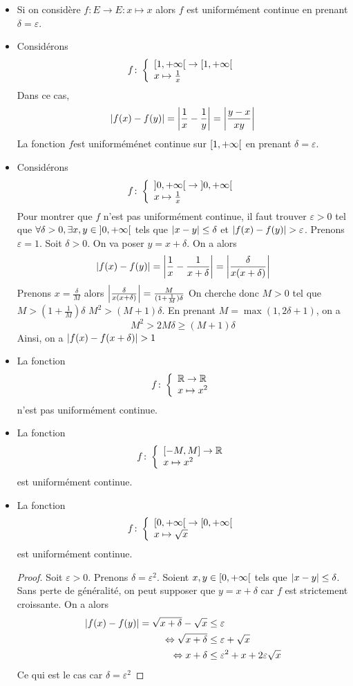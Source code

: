\begin{exemple}
    \begin{itemize}
        \item Si on considère $f : E\to E : x\mapsto x$ alors $f$ est uniformément continue en prenant $\delta = \varepsilon$.
        \item Considérons $$f\colon \left\{\begin{array}{l}\left[ 1,+\infty\right[\to \left[ 1,+\infty\right[ \\x\mapsto \frac1x\end{array}\right.$$
        Dans ce cas,$$\left| f(x)-f(y) \right| = \left| \frac1x - \frac1y \right| = \left| \frac{y-x}{xy} \right|$$
        La fonction $f$est uniforméménet continue sur $\left[ 1,+\infty\right[$ en prenant $\delta = \varepsilon$.
        \item Considérons $$f\colon \left\{\begin{array}{l}\left] 0,+\infty\right[\to\left] 0,+\infty\right[ \\x\mapsto\frac{1}{x}\end{array}\right.$$
        Pour montrer que $f$ n'est pas uniformément continue, il faut trouver $\varepsilon>0$ tel que $\forall\delta >0, \exists x,y\in \left] 0,+\infty\right[$ tels que $\left| x-y \right|\le \delta$ et $\abs{f(x)-f(y)}>\varepsilon$.
        Prenons $\varepsilon = 1$. Soit $\delta >0$. On va poser $y = x+\delta$. On a alors 
        \begin{align*}
            \left| f(x)-f(y) \right| = \left| \frac{1}{x}-\frac{1}{x+\delta} \right| = \left| \frac{\delta}{x(x+\delta)} \right|
        \end{align*}
        Prenons $x = \frac{\delta}{M}$ alors $\left| \frac{\delta}{x(x+\delta)} \right| = \frac{M}{(1 + \frac{1}{M})\delta}$
        On cherche donc $M>0$ tel que $M>(1+\frac1M)\delta$ \ie $M^2> (M+1)\delta$. En prenant $M = \max(1,2\delta + 1)$, on a $$M^2 > 2M\delta \ge (M+1)\delta$$
        Ainsi, on a $\abs{f(x)-f(x+\delta)}>1$
        \item La fonction $$f\colon \left\{\begin{array}{l}\mathbb{R}\to\mathbb{R} \\x\mapsto x^2\end{array}\right.$$ n'est pas uniformément continue.
        \item La fonction $$f\colon \left\{\begin{array}{l}\left[ -M,M\right]\to \mathbb{R} \\x\mapsto x^2\end{array}\right.$$ est uniformément continue.
        \item La fonction $$f\colon \left\{\begin{array}{l}\left[ 0,+\infty\right[\to \left[ 0,+\infty\right[ \\x\mapsto \sqrt x\end{array}\right.$$ est uniformément continue. 
        \begin{proof}
            Soit $\varepsilon >0$. Prenons $\delta =\varepsilon^2$.
            Soient $x,y\in \left[ 0,+\infty\right[$ tels que $\left| x-y \right|\le \delta$. Sans perte de généralité, on peut supposer que $y = x+\delta $ car $f$ est strictement croissante.
            On a alors 
            \begin{align*}
                \left| f(x)-f(y) \right| = \sqrt{x+\delta} -\sqrt{x}&\le \varepsilon\\
                \Leftrightarrow \sqrt{x+\delta}&\le \varepsilon + \sqrt{x}\\
                \Leftrightarrow x + \delta&\le \varepsilon^2 + x + 2\varepsilon\sqrt{x}
            \end{align*}
            Ce qui est le cas car $\delta = \varepsilon^2$
        \end{proof}
    \end{itemize}
\end{exemple}
